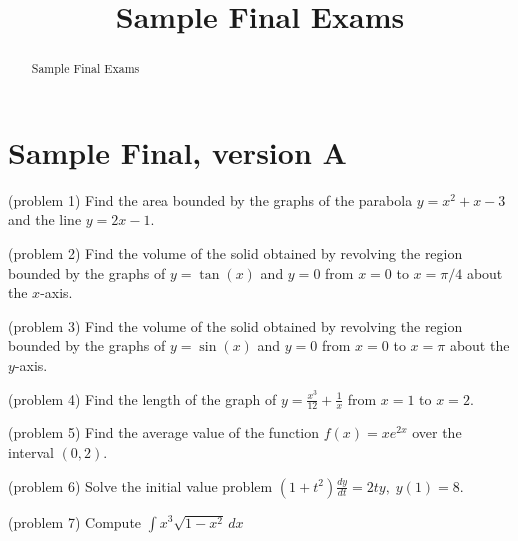 \documentclass[handout]{ximera}
\title{Sample Final Exams}
\begin{document}
\begin{abstract}
Sample Final Exams
\end{abstract}

\maketitle

\section{Sample Final, version A}


\begin{problem}(problem 1) 
Find the area bounded by the graphs of the parabola $y = x^2 + x - 3$ and the line $y = 2x - 1$.

\end{problem}

\begin{problem}(problem 2)
Find the volume of the solid obtained by revolving the region bounded by the graphs of $y = \tan(x)$ and $y = 0$
from $x = 0$ to $x = \pi/4$ about the $x$-axis.

\end{problem}


\begin{problem}(problem 3)
Find the volume of the solid obtained by revolving the region bounded by the graphs of $y = \sin(x)$ and $y = 0$
from $x = 0$ to $x = \pi$ about the $y$-axis.

\end{problem}


\begin{problem}(problem 4)
Find the length of the graph of
$y = \frac{x^3}{12} + \frac{1}{x}$ from $x = 1$ to $x = 2$.

\end{problem}

\begin{problem}(problem 5)
Find the average value of the function $f(x) = xe^{2x}$ over the interval $(0,2)$.

\end{problem}


\begin{problem}(problem 6)
Solve the initial value problem $ \displaystyle (1+t^2)\frac{dy}{dt} = 2ty, \; y(1) = 8 $.

\end{problem}



\begin{problem}(problem 7)
Compute $\displaystyle \int x^3 \sqrt{1-x^2} \, dx$

\end{problem}
\end{document}
